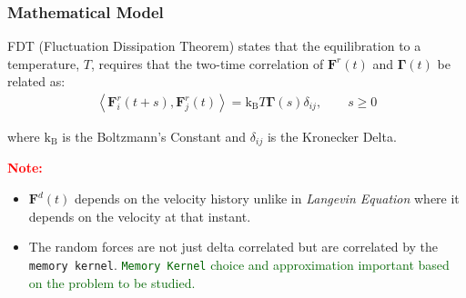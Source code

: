 \documentclass[a4paper,10pt]{beamer}
\newcommand{\BS}[1]{\boldsymbol{#1}}
\newcommand{\angbrac}[1]{\left \langle #1 \right \rangle}
\begin{document}
	\begin{frame}
		\small
		\frametitle{Mathematical Model}
		\begin{theorem}
			FDT (Fluctuation Dissipation Theorem) states that the equilibration to a temperature, $T$, requires that the two-time correlation of $\BS{F}^{r}(t)$ and $\BS{\Gamma}(t)$ be related as:
			\begin{align}
				\angbrac{\BS{F}^{r}_{i}(t+s),\BS{F}^{r}_{j}(t)} = \text{k}_{\text{B}} T \BS{\Gamma}(s) \delta_{ij}, \qquad s \geq 0
			\end{align}
		\end{theorem}
		where $\text{k}_{\text{B}}$ is the Boltzmann's Constant and $\delta_{ij}$ is the Kronecker Delta.
		\linebreak
		
		
		\textcolor{red}{\textbf{Note:}}
		\begin{itemize}
			\item {$\BS{F}^{d}(t)$ depends on the velocity history unlike in \textit{Langevin Equation}} where it depends on the velocity at that instant.
			\item {The random forces are not just delta correlated but are correlated by the \texttt{memory kernel}. \textcolor{darkgreen}{\texttt{Memory Kernel} choice and approximation important based on the problem to be studied.}}
		\end{itemize}
	\end{frame}
	
\end{document}
